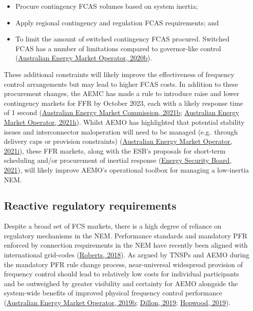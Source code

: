 \documentclass[12pt,a4paper,]{report}
\providecommand{\tightlist}{%
  \setlength{\itemsep}{0pt}\setlength{\parskip}{0pt}}
\begin{document}
\begin{itemize}
\tightlist
\item
  Procure contingency FCAS volumes based on system inertia;
\item
  Apply regional contingency and regulation FCAS requirements; and
\item
  To limit the amount of switched contingency FCAS procured. Switched
  FCAS has a number of limitations compared to governor-like control
  (\protect\hyperlink{ref-australianenergymarketoperatorRenewableIntegrationStudy2020c}{Australian
  Energy Market Operator, 2020b}).
\end{itemize}

These additional constraints will likely improve the effectiveness of
frequency control arrangements but may lead to higher FCAS costs. In
addition to these procurement changes, the AEMC has made a rule to
introduce raise and lower contingency markets for FFR by October 2023,
each with a likely response time of 1 second
(\protect\hyperlink{ref-australianenergymarketcommissionFastFrequencyResponse2021}{Australian
Energy Market Commission, 2021b};
\protect\hyperlink{ref-australianenergymarketoperatorFastFrequencyResponse2021}{Australian
Energy Market Operator, 2021h}). Whilst AEMO has highlighted that
potential stability issues and interconnector maloperation will need to
be managed (e.g.~through delivery caps or provision constraints)
(\protect\hyperlink{ref-australianenergymarketoperatorImplementationNationalElectricity2021}{Australian
Energy Market Operator, 2021i}), these FFR markets, along with the ESB's
proposals for short-term scheduling and/or procurement of inertial
response
(\protect\hyperlink{ref-energysecurityboardPost2025Market2021}{Energy
Security Board, 2021}), will likely improve AEMO's operational toolbox
for managing a low-inertia NEM.

\hypertarget{reactive-regulatory-requirements}{%
\subsection{Reactive regulatory
requirements}\label{reactive-regulatory-requirements}}

Despite a broad set of FCS markets, there is a high degree of reliance
on regulatory mechanisms in the NEM. Performance standards and mandatory
PFR enforced by connection requirements in the NEM have recently been
aligned with international grid-codes
(\protect\hyperlink{ref-robertsReviewInternationalGrid2018}{Roberts,
2018}). As argued by TNSPs and AEMO during the mandatory PFR rule change
process, near-universal widespread provision of frequency control should
lead to relatively low costs for individual participants and be
outweighed by greater visibility and certainty for AEMO alongside the
system-wide benefits of improved physical frequency control performance
(\protect\hyperlink{ref-australianenergymarketoperatorElectricityRuleChange2019}{Australian
Energy Market Operator, 2019b};
\protect\hyperlink{ref-dillonMandatoryPrimaryFrequency2019}{Dillon,
2019};
\protect\hyperlink{ref-hopwoodMandatoryPrimaryFrequency2019}{Hopwood,
2019}).
\end{document}
